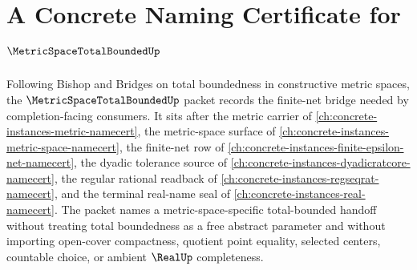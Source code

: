 \chapter{A Concrete Naming Certificate for $\MetricSpaceTotalBoundedUp$}
\label{ch:concrete-instances-metric-space-total-bounded-namecert}

Following Bishop and Bridges on total boundedness in constructive metric spaces, the $\MetricSpaceTotalBoundedUp$ packet records the finite-net bridge needed by completion-facing consumers. It sits after the metric carrier of \autoref{ch:concrete-instances-metric-namecert}, the metric-space surface of \autoref{ch:concrete-instances-metric-space-namecert}, the finite-net row of \autoref{ch:concrete-instances-finite-epsilon-net-namecert}, the dyadic tolerance source of \autoref{ch:concrete-instances-dyadicratcore-namecert}, the regular rational readback of \autoref{ch:concrete-instances-regseqrat-namecert}, and the terminal real-name seal of \autoref{ch:concrete-instances-real-namecert}. The packet names a metric-space-specific total-bounded handoff without treating total boundedness as a free abstract parameter and without importing open-cover compactness, quotient point equality, selected centers, countable choice, or ambient $\RealUp$ completeness.

